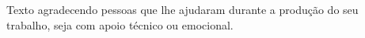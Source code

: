 %
%

\begin{agradecimento}	
		\noindent Texto agradecendo pessoas que lhe ajudaram durante a produção do seu trabalho, seja com apoio técnico ou emocional.
\end{agradecimento}

